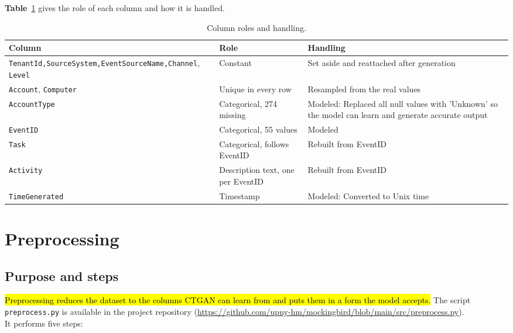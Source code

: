 \documentclass[11pt,a4paper]{article}
\begin{document}
\textbf{Table}~\ref{tab:roles} gives the role of each column and how it is handled.

\begin{table}[H]
\centering
\small
\renewcommand{\arraystretch}{1.25}
\begin{tabular}{@{}>{\raggedright\arraybackslash}p{4.0cm}
                  >{\raggedright\arraybackslash}p{4.0cm}
                  >{\raggedright\arraybackslash}p{5.6cm}@{}}
\toprule
\textbf{Column} & \textbf{Role} & \textbf{Handling}\\
\midrule
\texttt{TenantId,}\newline \texttt{SourceSystem,}\newline \texttt{EventSourceName,}\newline \texttt{Channel}, \texttt{Level}
  & Constant & Set aside and reattached after generation\\
\addlinespace
\texttt{Account}, \texttt{Computer}
  & Unique in every row & Resampled from the real values\\
\addlinespace
\texttt{AccountType} & Categorical, 274 missing & Modeled: Replaced all null values with 'Unknown' so the model can learn and generate accurate output\\
\addlinespace
\texttt{EventID} & Categorical, 55 values & Modeled\\
\addlinespace
\texttt{Task} & Categorical, follows EventID & Rebuilt  from EventID\\
\addlinespace
\texttt{Activity} & Description text, one per EventID & Rebuilt from EventID\\
\addlinespace
\texttt{TimeGenerated} & Timestamp & Modeled: Converted to Unix time\\
\bottomrule
\end{tabular}
\caption{Column roles and handling.}\label{tab:roles}
\end{table}








\section{Preprocessing}\label{sec:preprocessing}

\subsection{Purpose and steps}
\hl{Preprocessing reduces the dataset to the columns CTGAN can learn from and puts them in a form the model accepts.} The script \texttt{preprocess.py} is available in the project repository (\textcolor{blue}{\url{https://github.com/upny-hm/mockingbird/blob/main/src/preprocess.py}}).\\ It performs five steps:
\end{document}
